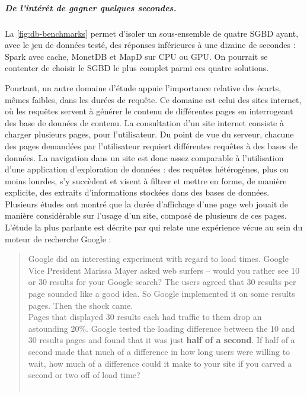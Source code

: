 \subparagraph{De l'intérêt de gagner quelques secondes.}

La \cref{fig:db-benchmarks} permet d'isoler un sous-ensemble de quatre SGBD ayant, avec le jeu de données testé, des réponses inférieures à une dizaine de secondes : Spark avec cache, MonetDB et MapD sur CPU ou GPU.
On pourrait se contenter de choisir le SGBD le plus complet parmi ces quatre solutions.

Pourtant, un autre domaine d'étude appuie l'importance relative des écarts, mêmes faibles, dans les durées de requête.
Ce domaine est celui des sites internet, où les requêtes servent à générer le contenu de différentes pages en interrogeant des base de données de contenu.
La consultation d'un site internet consiste à charger plusieurs pages, pour l'utilisateur.
Du point de vue du serveur, chacune des pages demandées par l'utilisateur requiert différentes requêtes à des bases de données.
La navigation dans un site est donc assez comparable à l'utilisation d'une application d'exploration de données : des requêtes hétérogènes, plus ou moins lourdes, s'y succèdent et visent à filtrer et mettre en forme, de manière explicite, des extraits d'informations stockées dans des bases de données.
Plusieurs études ont montré que la durée d'affichage d'une page web jouait de manière considérable sur l'usage d'un site, composé de plusieurs de ces pages.
L'étude la plus parlante est décrite par  qui relate une expérience vécue au sein du moteur de recherche Google  :\vspace{-0.5cm}

\begin{quotation}
	\noindent \og
	Google did an interesting experiment with regard to load times. Google Vice President Marissa Mayer asked web surfers – would you rather see 10 or 30 results for your Google search? The users agreed that 30 results per page sounded like a good idea. So Google implemented it on some results pages.
	Then the shock came.\\
	Pages that displayed 30 results each had traffic to them drop an astounding 20\%. Google tested the loading difference between the 10 and 30 results pages and found that it was just \textbf{half of a second}. If half of a second made that much of a difference in how long users were willing to wait, how much of a difference could it make to your site if you carved a second or two off of load time?
	\fg{}\\
	\mbox{}~ \hfill  \autocite{patel_speed_2011}
\end{quotation}\vspace{-0.5cm}

